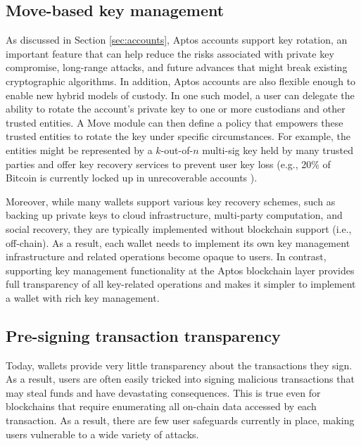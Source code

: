 \documentclass{article}
\begin{document}
\subsection{Move-based key management}

As discussed in Section \ref{sec:accounts}, Aptos accounts support key rotation, an important feature that can help reduce the risks associated with private key compromise, long-range attacks, and future advances that might break existing cryptographic algorithms.  In addition, Aptos accounts are also flexible enough to enable new hybrid models of custody. In one such model, a user can delegate the ability to rotate the account's private key to one or more custodians and other trusted entities. A Move module can then define a policy that empowers these trusted entities to rotate the key under specific circumstances. For example, the entities might be represented by a $k$-out-of-$n$ multi-sig key held by many trusted parties and offer key recovery services to prevent user key loss (e.g., 20\% of Bitcoin is currently locked up in unrecoverable accounts \cite{lost_passwords}). 

 
Moreover, while many wallets support various key recovery schemes, such as backing up private keys to cloud infrastructure, multi-party computation, and social recovery, they are typically implemented without blockchain support (i.e., off-chain). As a result, each wallet needs to implement its own key management infrastructure and related operations become opaque to users. In contrast, supporting key management functionality at the Aptos blockchain layer provides full transparency of all key-related operations and makes it simpler to implement a wallet with rich key management.

\subsection{Pre-signing transaction transparency}

Today, wallets provide very little transparency about the transactions they sign. As a result, users are often easily tricked into signing malicious transactions that may steal funds and have devastating consequences. This is true even for blockchains that require enumerating all on-chain data accessed by each transaction. As a result, there are few user safeguards currently in place, making users vulnerable to a wide variety of attacks. 
\end{document}
